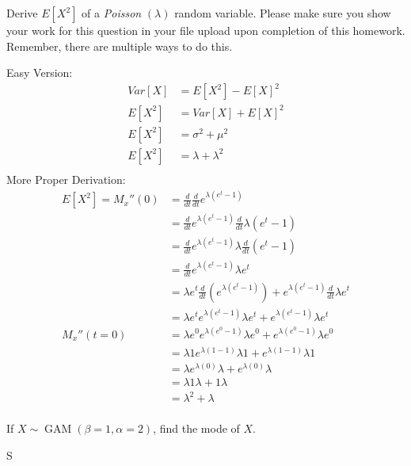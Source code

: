 \documentclass[answers]{exam}
\begin{document}
\begin{questions}
\question 
Derive \(E[X^2]\) of a \emph{Poisson} \((\lambda)\) random variable. Please make sure you show your work for this question in your file upload upon completion of this homework. Remember, there are multiple ways to do this.
\begin{solution}
	Easy Version:
	\begin{align*}
		Var[X] &= E[X^2] - E[X]^2 \\
		E[X^2] &= Var[X] + E[X]^2 \\
		E[X^2] &= \sigma^2 + \mu^2 \\
		E[X^2] &= \lambda + \lambda^2 \\
	\end{align*}
	More Proper Derivation:
	\begin{align*}
		E[X^2] = M_x''(0) 
		&= \frac{d}{dt}\frac{d}{dt} e^{\lambda(e^t-1)} \\
		&= \frac{d}{dt} e^{\lambda(e^t-1)} \frac{d}{dt} \lambda(e^t-1) \\
		&= \frac{d}{dt} e^{\lambda(e^t-1)} \lambda \frac{d}{dt} (e^t-1) \\
		&= \frac{d}{dt} e^{\lambda(e^t-1)} \lambda e^t \\
		&= \lambda e^t \frac{d}{dt}(e^{\lambda(e^t-1)}) 
		 + e^{\lambda(e^t-1)} \frac{d}{dt}\lambda e^t \\
		&= \lambda e^t e^{\lambda(e^t-1)} \lambda e^t
		 + e^{\lambda(e^t-1)} \lambda e^t \\
		M_x''(t=0)
		&= \lambda e^0 e^{\lambda(e^0-1)} \lambda e^0
		+ e^{\lambda(e^0-1)} \lambda e^0 \\ 
		&= \lambda 1 e^{\lambda(1-1)} \lambda 1
		+ e^{\lambda(1-1)} \lambda 1 \\ 
		&= \lambda e^{\lambda(0)} \lambda + e^{\lambda(0)} \lambda \\
		&= \lambda 1 \lambda + 1 \lambda \\ 
		&= \lambda^2 + \lambda \\   
	\end{align*}
\end{solution}

\question 
If \(X\sim\operatorname{GAM}(\beta=1,\alpha=2)\), find the mode of $X$.
\begin{solution}
	S
\end{solution}


\end{questions}
\end{document}
